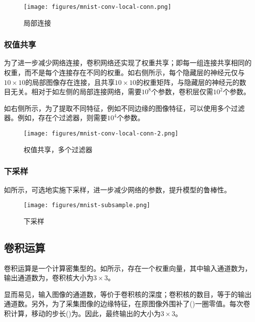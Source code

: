 \begin{content}
\begin{content}
\begin{figure}[H]
\centering
\texttt{[image: figures/mnist-conv-local-conn.png]}
\caption{局部连接}
 \label{fig:mnist-conv-local-conn}
\end{figure}

\subsubsection{权值共享}

为了进一步减少网络连接，卷积网络还实现了权重共享；即每一组连接共享相同的权重，而不是每个连接存在不同的权重。如右侧所示，每个隐藏层的神经元仅与$ 10 \times 10 $的局部图像存在连接，且共享$ 10 \times 10 $的权重矩阵，与隐藏层的神经元的数目无关。相对于如左侧的局部连接网络，需要$10^8$个参数，卷积层仅需$10^2$个参数。

如右侧所示，为了提取不同特征，例如不同边缘的图像特征，可以使用多个过滤器。例如，存在个过滤器，则需要$10^4$个参数。

\begin{figure}[H]
\centering
\texttt{[image: figures/mnist-conv-local-conn-2.png]}
\caption{权值共享，多个过滤器}
 \label{fig:mnist-conv-local-conn-2}
\end{figure}

\subsubsection{下采样}

如所示，可选地实施下采样，进一步减少网络的参数，提升模型的鲁棒性。

\begin{figure}[H]
\centering
\texttt{[image: figures/mnist-subsample.png]}
\caption{下采样}
 \label{fig:mnist-subsample}
\end{figure}

\subsection{卷积运算}

卷积运算是一个计算密集型的。如所示，存在一个权重向量，其中输入通道数为，输出通道数为，卷积核大小为$3 \times 3$。

显而易见，输入图像的通道数，等价于卷积核的深度；卷积核的数目，等于的输出通道数。另外，为了采集图像的边缘特征，在原图像外围补了()一圈零值。每次卷积计算，移动的步长()为。因此，最终输出的大小为$3 \times 3$。


\end{content}
\end{content}
